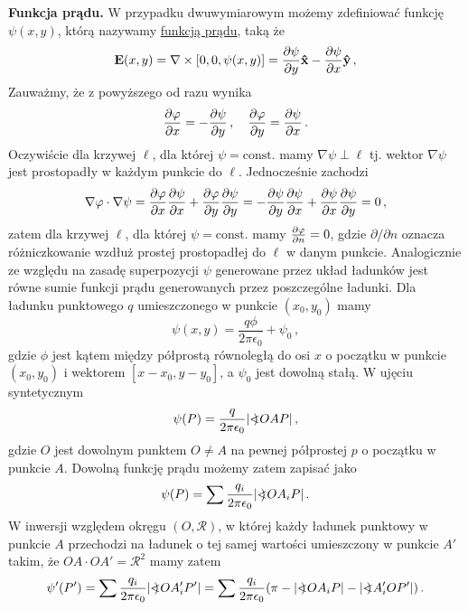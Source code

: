 \documentclass[../main.tex]{subfiles}
\begin{document}
\textbf{Funkcja prądu.} W przypadku dwuwymiarowym możemy zdefiniować funkcję \(\psi(x,y)\), którą
nazywamy \underline{funkcją prądu}, taką że
\begin{equation*}
    \mathbf{E}(x,y)=\nabla\times[0,0,\psi(x,y)]=\pdv{\psi}{y}\mathbf{\hat{x}}-\pdv{\psi}{x}\mathbf{\hat{y}}\,,
\end{equation*}
Zauważmy, że z powyższego od razu wynika
\begin{equation*}
    \pdv{\varphi}{x}=-\pdv{\psi}{y}\,,\quad\pdv{\varphi}{y}=\pdv{\psi}{x}\,.
\end{equation*}
Oczywiście dla krzywej \(\ell\), dla której \(\psi=\text{const.}\) mamy \(\nabla\psi\perp\ell\) tj.
wektor \(\nabla\psi\) jest prostopadły w każdym punkcie do \(\ell\). Jednocześnie zachodzi
\begin{equation*}
    \nabla\varphi\cdot\nabla\psi=\pdv{\varphi}{x}\pdv{\psi}{x}+\pdv{\varphi}{y}\pdv{\psi}{y}=-\pdv{\psi}{y}\pdv{\psi}{x}+\pdv{\psi}{x}\pdv{\psi}{y}=0\,,
\end{equation*}
zatem dla krzywej \(\ell\), dla której \(\psi=\text{const.}\) mamy \(\pdv{\varphi}{n}=0\), gdzie
\(\partial/\partial n\) oznacza różniczkowanie wzdłuż prostej prostopadłej do \(\ell\) w danym
punkcie. Analogicznie ze względu na zasadę superpozycji \(\psi\) generowane przez układ ładunków
jest równe sumie funkcji prądu generowanych przez poszczególne ładunki. Dla ładunku punktowego \(q\)
umieszczonego w punkcie \((x_0,y_0)\) mamy
\begin{equation*}
   \psi(x,y)=\frac{q\phi}{2\pi\epsilon_0}+\psi_0\,,
\end{equation*}
gdzie \(\phi\) jest kątem między półprostą równoległą do osi \(x\) o początku w punkcie
\((x_0,y_0)\) i wektorem \([x-x_0,y-y_0]\), a \(\psi_0\) jest dowolną stałą. W ujęciu syntetycznym
\begin{equation*}
    \psi(P)=\frac{q}{2\pi\epsilon_0}|\mathord{<\mspace{-9mu}\mathrel{)}\mspace{2mu}} OAP|\,,
\end{equation*}
gdzie \(O\) jest dowolnym punktem \(O\neq A\) na pewnej półprostej \(p\) o początku w punkcie \(A\).
Dowolną funkcję prądu możemy zatem zapisać jako
\begin{equation*}
    \psi(P)=\sum\frac{q_i}{2\pi\epsilon_0}|\mathord{<\mspace{-9mu}\mathrel{)}\mspace{2mu}} OA_iP|\,.
\end{equation*}
W inwersji względem okręgu \((O,\mathscr{R})\), w której każdy ładunek punktowy w punkcie \(A\)
przechodzi na ładunek o tej samej wartości umieszczony w punkcie \(A'\) takim, że \(OA\cdot
OA'=\mathscr{R}^2\) mamy zatem
\begin{equation*}
    \psi'(P')=\sum\frac{q_i}{2\pi\epsilon_0}|\mathord{<\mspace{-9mu}\mathrel{)}\mspace{2mu}} OA_i'P'|=\sum\frac{q_i}{2\pi\epsilon_0}(\pi-|\mathord{<\mspace{-9mu}\mathrel{)}\mspace{2mu}} OA_iP|-|\mathord{<\mspace{-9mu}\mathrel{)}\mspace{2mu}} A_i'OP'|)\,.
\end{equation*}
\end{document}
